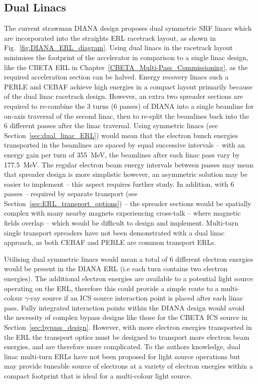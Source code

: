 \documentclass[../main.tex]{subfiles}
\begin{document}
\subsection{Dual Linacs}

The current strawman DIANA design proposes dual symmetric SRF linacs which are incorporated into the straights ERL racetrack layout, as shown in Fig.~\ref{fig:DIANA_ERL_diagram}. Using dual linacs in the racetrack layout minimises the footprint of the accelerator in comparison to a single linac design, like the CBETA ERL in Chapter~\ref{CBETA_Multi-Pass_Commissioning}, as the required acceleration section can be halved. Energy recovery linacs such a PERLE \cite{angal2018perle} and CEBAF \cite{meot2016er} achieve high energies in a compact layout primarily because of the dual linac racetrack design. However, an extra two spreader sections are required to re-combine the 3 turns (6 passes) of DIANA into a single beamline for on-axis traversal of the second linac, then to re-split the beamlines back into the 6 different passes after the linac traversal. Using symmetric linacs (see Section~\ref{sec:dual_linac_ERL}) would mean that the electron bunch energies transported in the beamlines are spaced by equal successive intervals -- with an energy gain per turn of 355~\si{\mega\electronvolt}, the beamlines after each linac pass vary by 177.5~\si{\mega\electronvolt}. The regular electron beam energy intervals between passes may mean that spreader design is more simplistic however, an asymmetric solution may be easier to implement -- this aspect requires further study. In addition, with 6 passes -- required by separate transport (see Section~\ref{sec:ERL_transport_options}) -- the spreader sections would be spatially complex with many nearby magnets experiencing cross-talk -- where magnetic fields overlap -- which would be difficult to design and implement. Multi-turn single transport spreaders have not been demonstrated with a dual linac approach, as both CEBAF \cite{meot2016er} and PERLE \cite{angal2018perle} are common transport ERLs. 

Utilising dual symmetric linacs would mean a total of 6 different electron energies would be present in the DIANA ERL (i.e each turn contains two electron energies). The additional electron energies are available to a potential light source operating on the ERL, therefore this could provide a simple route to a multi-colour $\gamma$-ray source if an ICS source interaction point is placed after each linac pass. Fully integrated interaction points within the DIANA design would avoid the necessity of complex bypass designs like those for the CBETA ICS source in Section~\ref{sec:bypass_design}. However, with more electron energies transported in the ERL the transport optics must be designed to transport more electron beam energies, and are therefore more complicated. To the authors knowledge, dual linac multi-turn ERLs have not been proposed for light source operations but may provide tuneable source of electrons at a variety of electron energies within a compact footprint that is ideal for a multi-colour light source.
\end{document}
